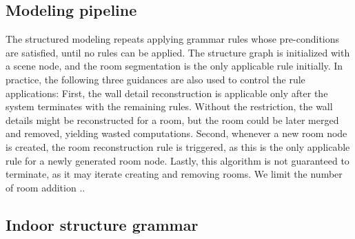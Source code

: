 


\subsection{Modeling pipeline}

The structured modeling repeats applying grammar rules whose
pre-conditions are satisfied, until no rules can be applied.  The
structure graph is initialized with a scene node, and the room
segmentation is the only applicable rule initially.  In practice, the
following three guidances are also used to control the rule applications:
First, the wall detail reconstruction is applicable only after the
system terminates with the remaining rules.  Without the restriction,
the wall details might be reconstructed for a room, but the room could
be later merged and removed, yielding wasted computations. Second,
whenever a new room node is created, the room reconstruction rule is
triggered, as this is the only applicable rule for a newly generated
room node.
Lastly, this algorithm is not guaranteed to terminate, as it may iterate
creating and removing rooms. We limit the number of room addition ..




\subsection{Indoor structure grammar}

